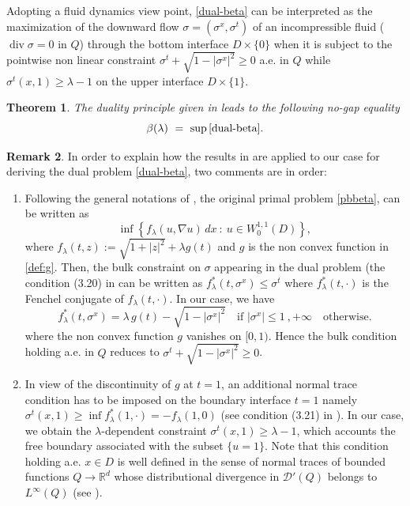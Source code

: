 \documentclass[reqno,11pt]{amsart}
\newtheorem{theorem}{Theorem}[section]
\theoremstyle{definition}
\newtheorem{remark}[theorem]{Remark}
\numberwithin{equation}{section}
\DeclareMathOperator{\Div}{div}
\newcommand{\DD}{\mathcal{D}}
\def\R{\mathbb{R}}
\newcommand{\1}{{{\bf 1}\kern-0,28em\rm l}}
\def\l{\lambda}
\begin{document}
Adopting a fluid dynamics view point, 
 \eqref{dual-beta} can be interpreted as the maximization of the  downward flow $\sigma=(\sigma^x,\sigma^t)$ of an incompressible fluid ($\Div\sigma =0$ in $Q$) through the bottom interface $D\times\{0\}$ when it is subject to the pointwise non linear constraint $\sigma^t + \sqrt{1- |\sigma^x|^2} \ge 0$ a.e. in $Q$ while $\sigma^t(x,1) \ge \lambda -1$ on the upper interface $D\times \{1\}$.
 
\begin{theorem}\label{duality1} The duality principle given  in \cite{bouphan2025} leads to the following no-gap equality
$$   \beta(\l) \ =\  \sup \eqref{dual-beta} .$$
\end{theorem}


\begin{remark}
In order to explain how the results in \cite[Secton 3.3]{boufra2018} are applied to our case for deriving the dual problem \eqref{dual-beta}, two comments are in order: 


\begin{enumerate}
\item [-]  Following the general notations of \cite{boufra2018}, the original primal problem \eqref{pbbeta}, can be written as
$$ \inf \left\{ f_\l(u, \nabla u) \, dx\ :\ u\in W^{1,1}_0(D) \right\} ,  $$
where $f_\l(t,z):= \sqrt{1+ |z|^2} + \l g(t)$ and $g$ is the non convex function in \eqref{def:g}.  
Then, the  bulk constraint  on $\sigma$ appearing in the dual problem (the condition (3.20) in \cite{boufra2018}  can be written as $f_\l^*(t, \sigma^x)\le \sigma^t$ where $f_\l^*(t,\cdot)$ is the Fenchel conjugate of $f_\l(t,\cdot)$. In our case, we have 
$$  f_\l^*(t, \sigma^x)= \l\, g(t)  - \sqrt{1- |\sigma^x|^2} \quad \text{if $|\sigma^x|\le 1$}\ , +\infty \quad \text{otherwise}.$$
where the non convex function $g$ vanishes on $[0,1)$. Hence the bulk condition holding a.e. in $Q$ reduces to $\sigma^t + \sqrt{1- |\sigma^x|^2} \ge 0$. 

\item[-] In view of the discontinuity of $g$ at $t=1$, an additional normal trace condition has to be imposed on the boundary interface $t=1$
namely $\sigma^t(x,1) \ge \inf f_\l^*(1, \cdot) =- f_\l(1,0)$ (see condition (3.21) in \cite{boufra2018}). In our case, we obtain 
the $\l$-dependent constraint $ \sigma^t(x,1) \ge \l-1$, which accounts the free boundary associated with the subset $\{u=1\} .$ 
Note that this condition holding a.e. $x\in D$ is well defined  in the sense of normal traces of bounded  functions $Q \to \R^d$ whose  distributional divergence in $\DD'(Q)$ belongs to $L^\infty(Q)$ (see \cite{Abis, Anzelloti1984}).
\end{enumerate}
\end{remark}
\end{document}
